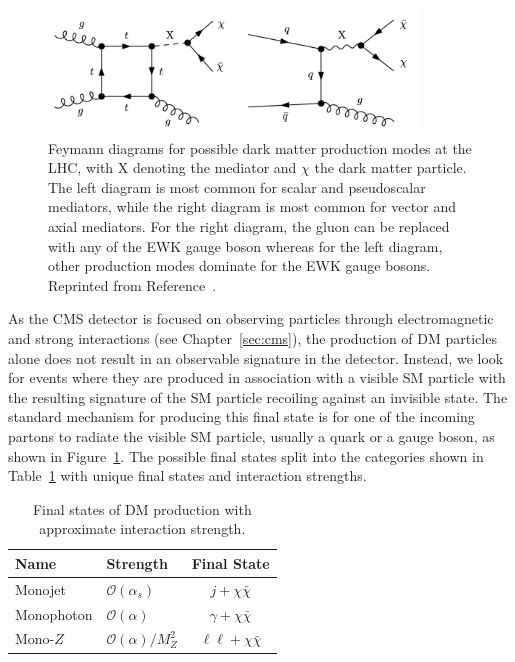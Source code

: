 \begin{figure}[htbp]
  \centering
  \includegraphics[width=0.875\textwidth]{DarkMatter/Figures/dm_diagram.png}
  \caption{
    Feymann diagrams for possible dark matter production modes at the LHC, with X denoting the mediator and $\chi$ the dark matter particle.
    The left diagram is most common for scalar and pseudoscalar mediators, while the right diagram is most common for vector and axial mediators.
    For the right diagram, the gluon can be replaced with any of the EWK gauge boson whereas for the left diagram, other production modes dominate for the EWK gauge bosons.
    Reprinted from Reference~\cite{}. %
  }
  \label{fig:dm_diagram}
\end{figure}

As the CMS detector is focused on observing particles through electromagnetic and strong interactions (see Chapter~\ref{sec:cms}), the production of DM particles alone does not result in an observable signature in the detector.
Instead, we look for events where they are produced in association with a visible SM particle with the resulting signature of the SM particle recoiling against an invisible state. 
The standard mechanism for producing this final state is for one of the incoming partons to radiate the visible SM particle, usually a quark or a gauge boson, as shown in Figure~\ref{fig:dm_diagram}.
The possible final states split into the categories shown in Table~\ref{tab:monox} with unique final states and interaction strengths.

\begin{table}[htbp]
\centering
\begin{tabular}{ l|l|c }
  Name & Strength & Final State \\
  \hline
  Monojet & $\mathcal{O}(\alpha_s)$ & $j+\chi\bar\chi$ \\
  Monophoton & $\mathcal{O}(\alpha)$ & $\gamma+\chi\bar\chi$ \\
  Mono-$Z$ & $\mathcal{O}(\alpha)/M_Z^2$ & $\ell\ell+\chi\bar\chi$ \\
\end{tabular}
\caption{
  Final states of DM production with approximate interaction strength.
}
\label{tab:monox}
\end{table}

